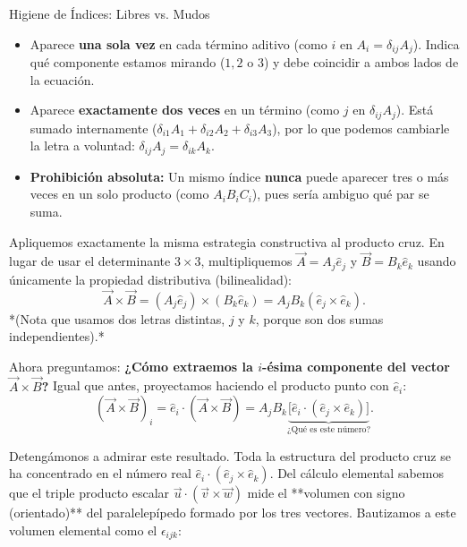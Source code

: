 \documentclass[11pt,letterpaper]{article}
\begin{document}
\begin{infobox}[pureblack]{Higiene de Índices: Libres vs. Mudos}
\begin{itemize}
    \item {} Aparece \textbf{una sola vez} en cada término aditivo (como $i$ en $A_i = \delta_{ij} A_j$). Indica qué componente estamos mirando ($1, 2$ o $3$) y debe coincidir a ambos lados de la ecuación.
    \item {} Aparece \textbf{exactamente dos veces} en un término (como $j$ en $\delta_{ij} A_j$). Está sumado internamente ($\delta_{i1}A_1 + \delta_{i2}A_2 + \delta_{i3}A_3$), por lo que podemos cambiarle la letra a voluntad: $\delta_{ij} A_j = \delta_{ik} A_k$.
    \item \textbf{Prohibición absoluta:} Un mismo índice \textbf{nunca} puede aparecer tres o más veces en un solo producto (como $A_i B_i C_i$), pues sería ambiguo qué par se suma.
\end{itemize}
\end{infobox}


Apliquemos exactamente la misma estrategia constructiva al producto cruz. En lugar de usar el determinante $3\times 3$, multipliquemos $\vec{A} = A_j \hat{e}_j$ y $\vec{B} = B_k \hat{e}_k$ usando únicamente la propiedad distributiva (bilinealidad):
\[
\vec{A} \times \vec{B} = (A_j \hat{e}_j) \times (B_k \hat{e}_k) = A_j B_k (\hat{e}_j \times \hat{e}_k).
\]
*(Nota que usamos dos letras distintas, $j$ y $k$, porque son dos sumas independientes).*

Ahora preguntamos: \textbf{¿Cómo extraemos la $i$-ésima componente del vector $\vec{A} \times \vec{B}$?} Igual que antes, proyectamos haciendo el producto punto con $\hat{e}_i$:
\[
(\vec{A} \times \vec{B})_i = \hat{e}_i \cdot (\vec{A} \times \vec{B}) = A_j B_k \underbrace{\big[\hat{e}_i \cdot (\hat{e}_j \times \hat{e}_k)\big]}_{\text{¿Qué es este número?}}.
\]

Detengámonos a admirar este resultado. Toda la estructura del producto cruz se ha concentrado en el número real $\hat{e}_i \cdot (\hat{e}_j \times \hat{e}_k)$. Del cálculo elemental sabemos que el triple producto escalar $\vec{u} \cdot (\vec{v} \times \vec{w})$ mide el **volumen con signo (orientado)** del paralelepípedo formado por los tres vectores. Bautizamos a este volumen elemental como el  $\epsilon_{ijk}$:
\end{document}
